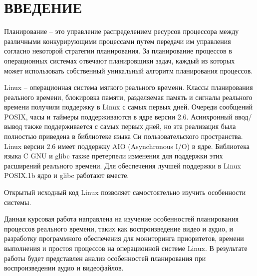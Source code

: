 \section*{ВВЕДЕНИЕ}

Планирование -- это управление распределением ресурсов процессора между различными конкурирующими процессами путем передачи им управления согласно некоторой стратегии планирования. За планирование процессов в операционных системах отвечают планировщики задач, каждый из которых может использовать собственный уникальный алгоритм планирования процессов.

Linux -- операционная система мягкого реального времени. Классы планирования реального времени, блокировка памяти, разделяемая память и сигналы реального времени получили поддержку в Linux с самых первых дней. Очереди сообщений POSIX, часы и таймеры поддерживаются в ядре версии 2.6. Асинхронный ввод/вывод также поддерживается с самых первых дней, но эта реализация была полностью приведена в библиотеке языка Си пользовательского пространства. Linux версии 2.6 имеет поддержку AIO (Asynchronous I/O) в ядре. Библиотека языка C GNU и glibc также претерпели изменения для поддержки этих расширений реального времени. Для обеспечения лучшей поддержки в Linux POSIX.1b ядро и glibc работают вместе.

Открытый исходный код Linux позволяет самостоятельно изучить особенности системы.

Данная курсовая работа направлена на изучение особенностей планирования процессов реального времени, таких как воспроизведение видео и аудио, и разработку программного обеспечения для мониторинга приоритетов, времени выполнения и простоя процессов на операционной системе Linux. В результате работы будет представлен анализ особенностей планирования при воспроизведении аудио и видеофайлов.

\pagebreak